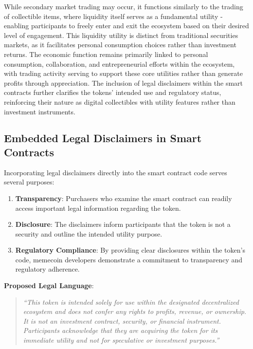 \documentclass[a4paper,12pt]{article}
\begin{document}
While secondary market trading may occur, it functions similarly to the trading of collectible items, where liquidity itself serves as a fundamental utility - enabling participants to freely enter and exit the ecosystem based on their desired level of engagement. This liquidity utility is distinct from traditional securities markets, as it facilitates personal consumption choices rather than investment returns. The economic function remains primarily linked to personal consumption, collaboration, and entrepreneurial efforts within the ecosystem, with trading activity serving to support these core utilities rather than generate profits through appreciation. The inclusion of legal disclaimers within the smart contracts further clarifies the tokens' intended use and regulatory status, reinforcing their nature as digital collectibles with utility features rather than investment instruments.

\subsection{Embedded Legal Disclaimers in Smart Contracts}
Incorporating legal disclaimers directly into the smart contract code serves several purposes:

\begin{enumerate}[label=\alph*)]
 \item \textbf{Transparency}: Purchasers who examine the smart contract can readily access important legal information regarding the token.
 \item \textbf{Disclosure}: The disclaimers inform participants that the token is not a security and outline the intended utility purpose.
 \item \textbf{Regulatory Compliance}: By providing clear disclosures within the token's code, memecoin developers demonstrate a commitment to transparency and regulatory adherence.
\end{enumerate}

\textbf{Proposed Legal Language}:

\begin{quote}
\emph{``This token is intended solely for use within the designated decentralized ecosystem and does not confer any rights to profits, revenue, or ownership. It is not an investment contract, security, or financial instrument. Participants acknowledge that they are acquiring the token for its immediate utility and not for speculative or investment purposes.''}
\end{quote}
\end{document}
